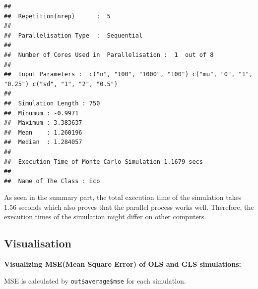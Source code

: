 \documentclass[11pt,a4paper]{article}
\begin{document}
\begin{verbatim}
## 
##  Repetition(nrep)      :  5 
## 
##  Parallelisation Type  :  Sequential 
## 
##  Number of Cores Used in  Parallelisation :  1  out of 8 
## 
##  Input Parameters :  c("n", "100", "1000", "100") c("mu", "0", "1", "0.25") c("sd", "1", "2", "0.5") 
## 
##  Simulation Length : 750 
##  Minumum : -0.9971 
##  Maximum : 3.383637 
##  Mean    : 1.260196 
##  Median  : 1.284057 
## 
##  Execution Time of Monte Carlo Simulation 1.1679 secs 
## 
##  Name of The Class : Eco
\end{verbatim}

As seen in the summary part, the total execution time of the simulation
takes 1.56 seconds which also proves that the parallel process works
well. Therefore, the execution times of the simulation might differ on
other computers.

\hypertarget{visualisation}{%
\subsection{Visualisation}\label{visualisation}}

\textbf{Visualizing MSE(Mean Square Error) of OLS and GLS simulations:}

MSE is calculated by \texttt{out\$average\$mse} for each simulation.
\end{document}
